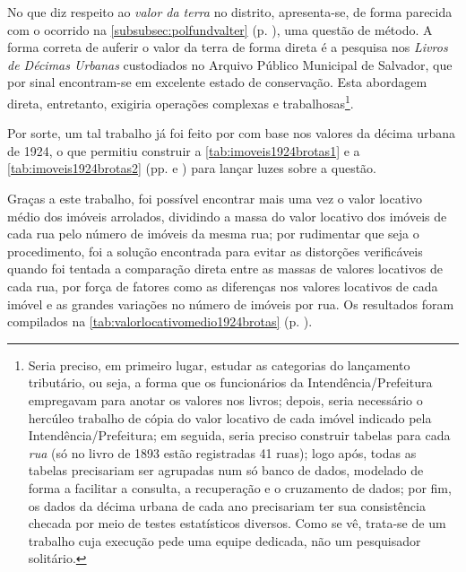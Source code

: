 No que diz respeito ao \textit{valor da terra} no distrito, apresenta-se, de forma parecida com o ocorrido na \autoref{subsubsec:polfundvalter} (p. \pageref{subsubsec:polfundvalter}), uma questão de método. A forma correta de auferir o valor da terra de forma direta é a pesquisa nos \textit{Livros de Décimas Urbanas} custodiados no Arquivo Público Municipal de Salvador, que por sinal encontram-se em excelente estado de conservação. Esta abordagem direta, entretanto, exigiria operações complexas e trabalhosas\footnote{Seria preciso, em primeiro lugar, estudar as categorias do lançamento tributário, ou seja, a forma que os funcionários da Intendência/Prefeitura empregavam para anotar os valores nos livros; depois, seria necessário o hercúleo trabalho de cópia do valor locativo de cada imóvel indicado pela Intendência/Prefeitura; em seguida, seria preciso construir tabelas para cada \textit{rua} (só no livro de 1893 estão registradas 41 ruas); logo após, todas as tabelas precisariam ser agrupadas num só banco de dados, modelado de forma a facilitar a consulta, a recuperação e o cruzamento de dados; por fim, os dados da décima urbana de cada ano precisariam ter sua consistência checada por meio de testes estatísticos diversos. Como se vê, trata-se de um trabalho cuja execução pede uma equipe dedicada, não um pesquisador solitário.}.

Por sorte, um tal trabalho já foi feito por  com base nos valores da décima urbana de 1924, o que permitiu construir a \autoref{tab:imoveis1924brotas1} e a \autoref{tab:imoveis1924brotas2} (pp. \pageref{tab:imoveis1924brotas1} e \pageref{tab:imoveis1924brotas2}) para lançar luzes sobre a questão. 




Graças a este trabalho, foi possível encontrar mais uma vez o valor locativo médio dos imóveis arrolados, dividindo a massa do valor locativo dos imóveis de cada rua pelo número de imóveis da mesma rua; por rudimentar que seja o procedimento, foi a solução encontrada para evitar as distorções verificáveis quando foi tentada a comparação direta entre as massas de valores locativos de cada rua, por força de fatores como as diferenças nos valores locativos de cada imóvel e as grandes variações no número de imóveis por rua. Os resultados foram compilados na \autoref{tab:valorlocativomedio1924brotas} (p. \pageref{tab:valorlocativomedio1924brotas}).

